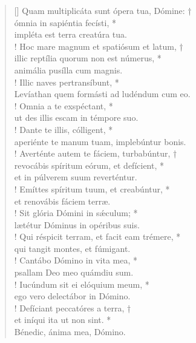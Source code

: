 \begin{verse}[\versewidth]
Quam multiplicáta sunt ópera tua, Dómine: †\\
ómnia in sapiéntia fecísti, *\\
impléta est terra creatúra tua.\\!
\vin Hoc mare magnum et spatiósum et latum, †\\
\vin illic reptília quorum non est númerus, *\\
animália pusílla cum magnis.\\!
Illic naves pertransíbunt, *\\
\vin Levíathan quem formásti ad ludéndum cum eo.\\!
\vin Omnia a te exspéctant, *\\
ut des illis escam in témpore suo.\\!
\vin Dante te illis, cólligent, *\\
\vin aperiénte te manum tuam, implebúntur bonis.\\!
Averténte autem te fáciem, turbabúntur, †\\
revocábis spíritum eórum, et defícient, *\\
et in púlverem suum reverténtur.\\!
\vin Emíttes spíritum tuum, et creabúntur, *\\
\vin et renovábis fáciem terræ.\\!
Sit glória Dómini in s\'{æ}culum; *\\
lætétur Dóminus in opéribus suis.\\!
\vin Qui réspicit terram, et facit eam trémere, *\\
\vin qui tangit montes, et fúmigant.\\!
Cantábo Dómino in vita mea, *\\
psallam Deo meo quámdiu sum.\\!
\vin Iucúndum sit ei elóquium meum, *\\
\vin ego vero delectábor in Dómino.\\!
Defíciant peccatóres a terra, †\\
et iníqui ita ut non sint. *\\
Bénedic, ánima mea, Dómino.\\
\end{verse}
\vspace{1cm}


